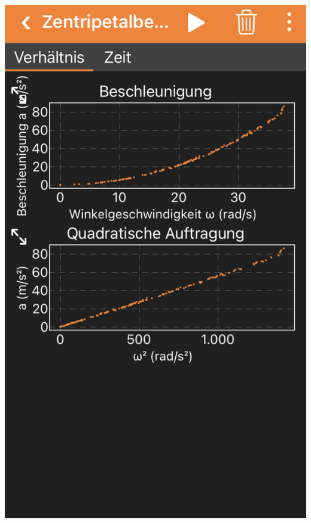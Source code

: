 \documentclass[../main.tex]{subfiles}
\begin{document}
\begin{tcolorbox}
\begin{minipage}[]{0.22\textwidth}
        \includegraphics[width=\textwidth]{img/app1}


\end{minipage}
\end{tcolorbox}
\end{document}

